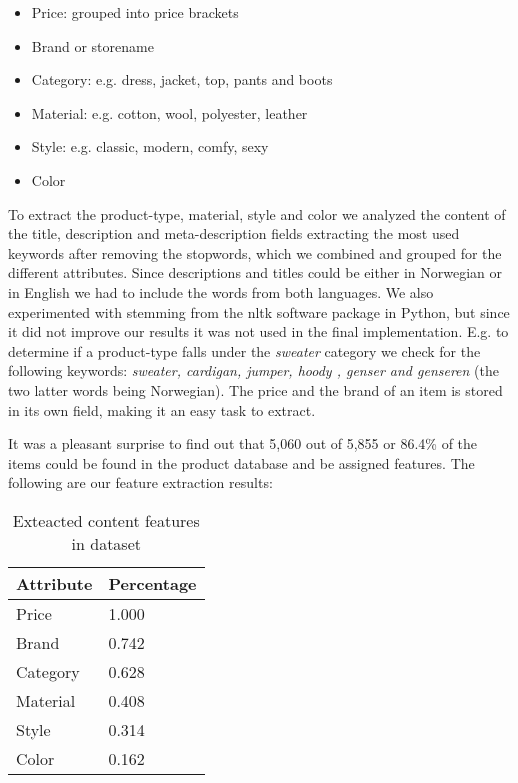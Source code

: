 \begin{itemize}
\item Price: grouped into price brackets
\item Brand or storename
\item Category: e.g. dress, jacket, top, pants and boots
\item Material: e.g. cotton, wool, polyester, leather
\item Style: e.g. classic, modern, comfy, sexy
\item Color
\end{itemize}

To extract the product-type, material, style and color we analyzed the content
of the title, description and meta-description fields extracting the most used
keywords after removing the stopwords, which we combined and grouped for the
different attributes. Since descriptions and titles could be either in
Norwegian or in English we had to include the words from both languages. We
also experimented with stemming from the nltk software package in Python, but
since it did not improve our results it was not used in the final
implementation. E.g. to determine if a product-type falls under the
\emph{sweater} category we check for the following keywords: \emph{sweater,
cardigan, jumper, hoody , genser and genseren} (the two latter words being
Norwegian).  The price and the brand of an item is stored in its own field,
making it an easy task to extract. \newline

It was a pleasant surprise to find out that 5,060 out of 5,855 or 86.4\% of the
items could be found in the product database and be assigned features. The
following are our feature extraction results:

\begin{table}[H]
	\centering
	\begin{tabular}{l l}
	\toprule
	Attribute & Percentage  \\ \midrule
	Price 			& 1.000 \\
	Brand 			& 0.742 \\
	Category 		& 0.628 \\
	Material 		& 0.408 \\
	Style 			& 0.314 \\
	Color 			& 0.162 \\
	\bottomrule
	\end{tabular}
    \caption[Extracted content features]{Exteacted content features in dataset}
	\label{table:extracted-content-features}
\end{table}

